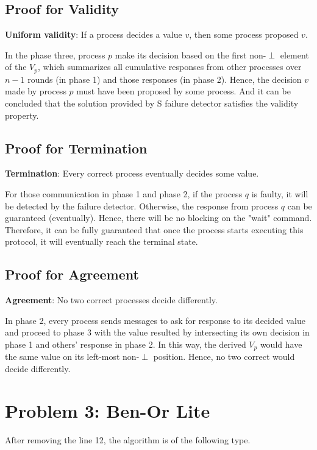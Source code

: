\documentclass[11pt,a4paper]{article}
\begin{document}
\subsection{Proof for Validity}
{\bf Uniform validity}: If a process decides a value $v$, then some process
proposed $v$.

In the phase three, process $p$ make its
decision based on the first non-$\perp$ element of the $V_p$, which summarizes
all cumulative responses from other processes over $n-1$ rounds (in phase 1) and those
responses (in phase 2). Hence, the decision $v$ made by process $p$
must have been proposed by some process. And it can be concluded that the
solution provided by S failure detector satisfies the validity property.

\subsection{Proof for Termination}
{\bf Termination}: Every correct process eventually decides some value. 

For those communication in phase 1 and phase 2, if the process $q$ is faulty,
it will be detected by the failure detector. Otherwise, the response from
process $q$ can be guaranteed (eventually). Hence, there will be no blocking on the "wait"
command. Therefore, it can be fully guaranteed that once the process starts
executing this protocol, it will eventually reach the terminal state.

\subsection{Proof for Agreement}
{\bf Agreement}: No two correct processes decide differently.

In phase 2, every process sends messages to ask for response to its decided
value and proceed to phase 3 with the value resulted by intersecting its own
decision in phase 1 and others' response in phase 2. In this way, the derived
$V_p$ would have the same value on its left-most non-$\perp$ position. Hence,
no two correct would decide differently.

\newpage

\section{Problem 3: Ben-Or Lite}
After removing the line 12, the algorithm is of the following type.
\end{document}
